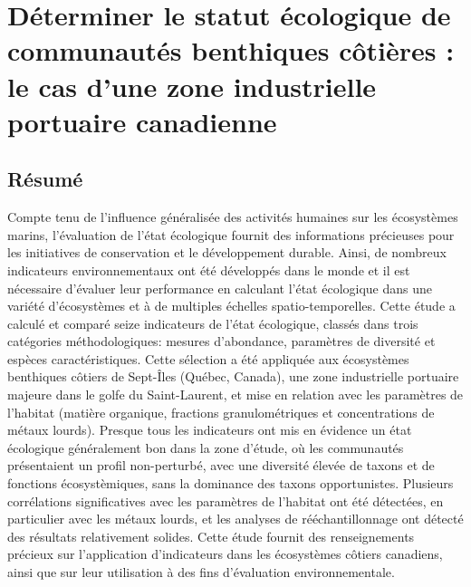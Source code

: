 \chapter{Déterminer le statut écologique de communautés benthiques côtières : le cas d'une zone industrielle portuaire canadienne}
\label{chap2}

\section{Résumé}
Compte tenu de l'influence généralisée des activités humaines sur les écosystèmes marins, l'évaluation de l'état écologique fournit des informations précieuses pour les initiatives de conservation et le développement durable. Ainsi, de nombreux indicateurs environnementaux ont été développés dans le monde et il est nécessaire d'évaluer leur performance en calculant l'état écologique dans une variété d'écosystèmes et à de multiples échelles spatio-temporelles. Cette étude a calculé et comparé seize indicateurs de l'état écologique, classés dans trois catégories méthodologiques: mesures d'abondance, paramètres de diversité et espèces caractéristiques. Cette sélection a été appliquée aux écosystèmes benthiques côtiers de Sept-Îles (Québec, Canada), une zone industrielle portuaire majeure dans le golfe du Saint-Laurent, et mise en relation avec les paramètres de l'habitat (matière organique, fractions granulométriques et concentrations de métaux lourds). Presque tous les indicateurs ont mis en évidence un état écologique généralement bon dans la zone d'étude, où les communautés présentaient un profil non-perturbé, avec une diversité élevée de taxons et de fonctions écosystèmiques, sans la dominance des taxons opportunistes. Plusieurs corrélations significatives avec les paramètres de l'habitat ont été détectées, en particulier avec les métaux lourds, et les analyses de rééchantillonnage ont détecté des résultats relativement solides. Cette étude fournit des renseignements précieux sur l'application d'indicateurs dans les écosystèmes côtiers canadiens, ainsi que sur leur utilisation à des fins d'évaluation environnementale. \linebreak[4]

